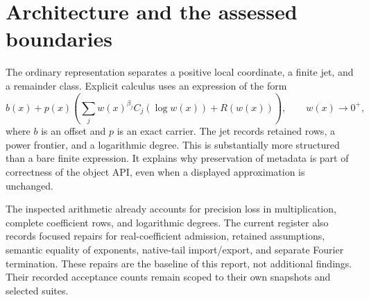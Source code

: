 \documentclass[11pt,letterpaper]{article}
\begin{document}
\section{Architecture and the assessed boundaries}
\label{sec:architecture}

The ordinary representation separates a positive local coordinate, a finite
jet, and a remainder class. Explicit calculus uses an expression of the form
\[
  b(x)+p(x)\left(\sum_j w(x)^{\beta_j} C_j(\log w(x))+R(w(x))\right),
  \qquad w(x)\to0^+,
\]
where $b$ is an offset and $p$ is an exact carrier. The jet records retained rows,
a power frontier, and a logarithmic degree. This is substantially more structured
than a bare finite expression. It explains why preservation of metadata is part
of correctness of the object API, even when a displayed approximation is
unchanged.\cite{core,operations}

The inspected arithmetic already accounts for precision loss in multiplication,
complete coefficient rows, and logarithmic degrees. The current register also
records focused repairs for real-coefficient admission, retained assumptions,
semantic equality of exponents, native-tail import/export, and separate Fourier
termination. These repairs are the baseline of this report, not additional
findings. Their recorded acceptance counts remain scoped to their own snapshots
and selected suites.\cite{status,w3}
\end{document}
